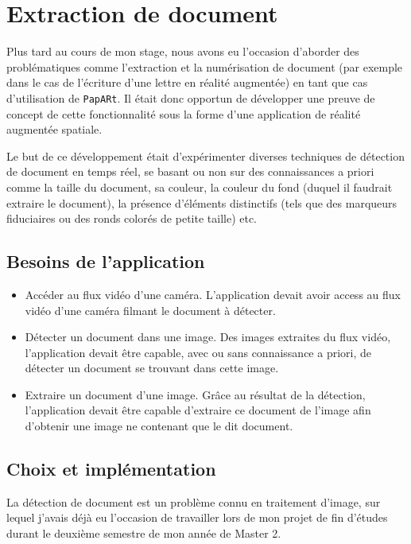\newpage
\section{Extraction de document}
\label{sec:document}
Plus tard au cours de mon stage, nous avons eu l'occasion d'aborder des problématiques comme l'extraction et la numérisation de document (par exemple dans le cas de l'écriture d'une lettre en réalité augmentée) en tant que cas d'utilisation de \texttt{PapARt}. Il était donc opportun de développer une preuve de concept de cette fonctionnalité sous la forme d'une application de réalité augmentée spatiale.

Le but de ce développement était d'expérimenter diverses techniques de détection de document en temps réel, se basant ou non sur des connaissances a priori comme la taille du document, sa couleur, la couleur du fond (duquel il faudrait extraire le document), la présence d'éléments distinctifs (tels que des marqueurs fiduciaires ou des ronds colorés de petite taille) etc.

\subsection{Besoins de l'application}
\label{subsec:doc:content}
\begin{itemize}
\item Accéder au flux vidéo d'une caméra. L'application devait avoir access au flux vidéo d'une caméra filmant le document à détecter.
\item Détecter un document dans une image. Des images extraites du flux vidéo, l'application devait être capable, avec ou sans connaissance a priori, de détecter un document se trouvant dans cette image.
\item Extraire un document d'une image. Grâce au résultat de la détection, l'application devait être capable d'extraire ce document de l'image afin d'obtenir une image ne contenant que le dit document.
\end{itemize}

\subsection{Choix et implémentation}
\label{subsec:doc:impl}

La détection de document est un problème connu en traitement d'image, sur lequel j'avais déjà eu l'occasion de travailler lors de mon projet de fin d'études durant le deuxième semestre de mon année de Master 2.

